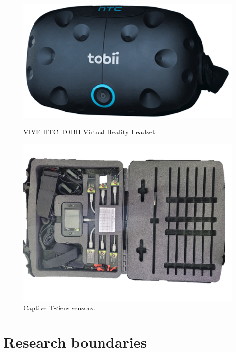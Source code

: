 \begin{figure}[!htb]
    \begin{minipage}{.45\linewidth}
        \centering
        \includegraphics[width=\linewidth]{Introducao/VIVE.png}
        \vspace{1.2cm}
        \caption{VIVE HTC TOBII Virtual Reality Headset.}
        \label{fig:htc_vive}
    \end{minipage}
    \begin{minipage}{.1\linewidth}
        \hfill
    \end{minipage}
    \begin{minipage}{.45\linewidth}
        \centering
        \includegraphics[width=\linewidth]{Introducao/sensores.png}
        \caption{Captive T-Sens sensors.}
        \label{fig:sensores}
    \end{minipage}
\end{figure}

\section{Research boundaries}

